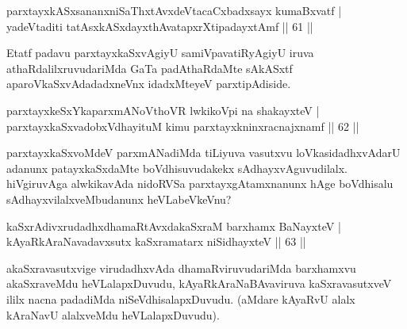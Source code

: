 \begin{shl}
parxtayxkASxsananxniSaThxtAvxdeVtacaCxbadxsayx kumaBxvatf |\\
\footnotemark[1]yadeVtaditi tatAsxkASxdayxthAvatapxrXtipadayxtAmf \hfill || 61 ||
\end{shl}

\begin{artha}
Etatf padavu parxtayxkaSxvAgiyU samiVpavatiRyAgiyU iruva athaRdalilx\-ruvudariMda GaTa padAthaRdaMte sAkASxtf aparoVkaSxvAdadadxneVnx idadxMteyeV parxtipAdiside.
\end{artha}


\begin{shl}
parxtayxkeSxYkaparxmANoV\s thoVR lwkikoV\s pi na shakayxteV |\\
parxtayxkaSxvadobxVdhayituM kimu parxtayxkninxracnajxnamf \hfill || 62 ||
\end{shl}

\begin{artha}
parxtayxkaSxvoMdeV parxmANadiMda tiLiyuva vasutxvu loVkasidadhxvAdarU adanunx patayxkaSxdaMte boVdhisuvudakekx sAdhayxvAguvudilalx. hiVgiruvAga alwkikavAda nidoRVSa parxtayxgAtamxnanunx hAge boVdhisalu sAdhayxvilalxveMbudanunx heVLabeVkeVnu? 
\end{artha}


\begin{shl}
kaSxrAdivxrudadhxdhamaRtAvxdakaSxraM barxhamx BaNayxteV |\\
kAyaRkAraNavadavxsutx kaSxramatarx niSidhayxteV \hfill || 63 ||
\end{shl}

\begin{artha}
akaSxravasutxvige virudadhxvAda dhamaRviruvudariMda barxhamxvu akaSxraveMdu heVLalapxDuvudu, kAyaRkAraNaBAvaviruva kaSxravasutxveV ililx nacna padadiMda niSeVdhisalapxDuvudu. (aMdare kAyaRvU alalx kAraNavU alalxveMdu heVLalapxDuvudu).
\end{artha}

